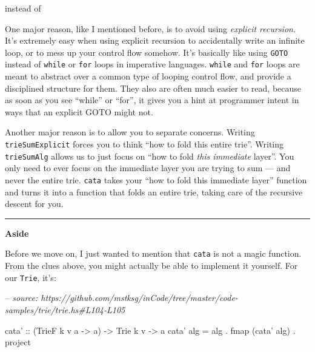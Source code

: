 \documentclass[]{article}
\newenvironment{Shaded}{}{}
\newcommand{\CommentTok}[1]{\textcolor[rgb]{0.38,0.63,0.69}{\textit{#1}}}
\newcommand{\DataTypeTok}[1]{\textcolor[rgb]{0.56,0.13,0.00}{#1}}
\newcommand{\DecValTok}[1]{\textcolor[rgb]{0.25,0.63,0.44}{#1}}
\newcommand{\FunctionTok}[1]{\textcolor[rgb]{0.02,0.16,0.49}{#1}}
\newcommand{\NormalTok}[1]{#1}
\newcommand{\OtherTok}[1]{\textcolor[rgb]{0.00,0.44,0.13}{#1}}
\begin{document}
instead of

\begin{Shaded}
\end{Shaded}

One major reason, like I mentioned before, is to avoid using \emph{explicit
recursion}. It's extremely easy when using explicit recursion to accidentally
write an infinite loop, or to mess up your control flow somehow. It's basically
like using \texttt{GOTO} instead of \texttt{while} or \texttt{for} loops in
imperative languages. \texttt{while} and \texttt{for} loops are meant to
abstract over a common type of looping control flow, and provide a disciplined
structure for them. They also are often much easier to read, because as soon as
you see ``while'' or ``for'', it gives you a hint at programmer intent in ways
that an explicit GOTO might not.

Another major reason is to allow you to separate concerns. Writing
\texttt{trieSumExplicit} forces you to think ``how to fold this entire trie''.
Writing \texttt{trieSumAlg} allows us to just focus on ``how to fold \emph{this
immediate} layer''. You only need to ever focus on the immediate layer you are
trying to sum --- and never the entire trie. \texttt{cata} takes your ``how to
fold this immediate layer'' function and turns it into a function that folds an
entire trie, taking care of the recursive descent for you.

\begin{center}\rule{0.5\linewidth}{\linethickness}\end{center}

\textbf{Aside}

Before we move on, I just wanted to mention that \texttt{cata} is not a magic
function. From the clues above, you might actually be able to implement it
yourself. For our \texttt{Trie}, it's:

\begin{Shaded}
\begin{Highlighting}[]
\CommentTok{-- source: https://github.com/mstksg/inCode/tree/master/code-samples/trie/trie.hs#L104-L105}

\OtherTok{cata' ::}\NormalTok{ (}\DataTypeTok{TrieF}\NormalTok{ k v a }\OtherTok{->}\NormalTok{ a) }\OtherTok{->} \DataTypeTok{Trie}\NormalTok{ k v }\OtherTok{->}\NormalTok{ a}
\NormalTok{cata' alg }\FunctionTok{=}\NormalTok{ alg }\FunctionTok{.}\NormalTok{ fmap (cata' alg) }\FunctionTok{.}\NormalTok{ project}
\end{Highlighting}
\end{Shaded}
\end{document}
